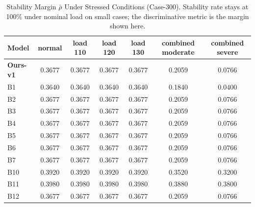 \begin{table}[t]
\centering
\caption{Stability Margin $\bar{\rho}$ Under Stressed Conditions (Case-300). Stability rate stays at 100\% under nominal load on small cases; the discriminative metric is the margin shown here.}
\label{tab:stress_test}
\begin{tabular}{lcccccc}
\toprule
Model & normal & load 110 & load 120 & load 130 & combined moderate & combined severe \\
\midrule
\textbf{Ours-v1} & 0.3677 & 0.3677 & 0.3677 & 0.3677 & 0.2059 & 0.0766 \\
B1 & 0.3640 & 0.3640 & 0.3640 & 0.3640 & 0.1840 & 0.0400 \\
B2 & 0.3677 & 0.3677 & 0.3677 & 0.3677 & 0.2059 & 0.0766 \\
B3 & 0.3677 & 0.3677 & 0.3677 & 0.3677 & 0.2059 & 0.0766 \\
B4 & 0.3677 & 0.3677 & 0.3677 & 0.3677 & 0.2059 & 0.0766 \\
B5 & 0.3677 & 0.3677 & 0.3677 & 0.3677 & 0.2059 & 0.0766 \\
B6 & 0.3677 & 0.3677 & 0.3677 & 0.3677 & 0.2059 & 0.0766 \\
B7 & 0.3677 & 0.3677 & 0.3677 & 0.3677 & 0.2059 & 0.0766 \\
B10 & 0.3920 & 0.3920 & 0.3920 & 0.3920 & 0.3520 & 0.3200 \\
B11 & 0.3980 & 0.3980 & 0.3980 & 0.3980 & 0.3880 & 0.3800 \\
B12 & 0.3677 & 0.3677 & 0.3677 & 0.3677 & 0.2059 & 0.0766 \\
\bottomrule
\end{tabular}
\end{table}